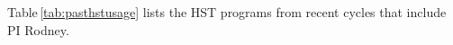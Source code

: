 \documentclass[12pt]{article}
\begin{document}
Table\,\ref{tab:pasthstusage} lists the HST programs from recent cycles that include PI Rodney.



\setlength{\bibsep}{-5pt}
\begin{spacing}{0.25}

{\footnotesize

}
\end{spacing}




\end{document}
